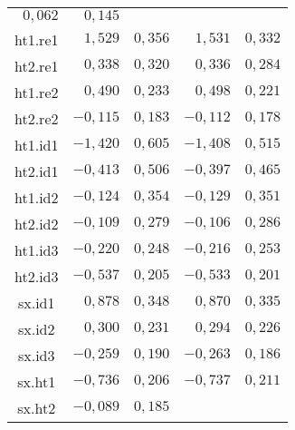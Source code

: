 \documentclass[]{book}
\begin{document}
\begin{center}
\begin{table}[tbp]
\begin{tabular}{|c|cc|cc|}
\multicolumn{1}{|r}{$0,062$} & \multicolumn{1}{r|}{$0,145$} \\ 
ht1.re1 & \multicolumn{1}{|r}{$1,529$} & \multicolumn{1}{r|}{$0,356$} & 
\multicolumn{1}{|r}{$1,531$} & \multicolumn{1}{r|}{$0,332$} \\ 
ht2.re1 & \multicolumn{1}{|r}{$0,338$} & \multicolumn{1}{r|}{$0,320$} & 
\multicolumn{1}{|r}{$0,336$} & \multicolumn{1}{r|}{$0,284$} \\ 
ht1.re2 & \multicolumn{1}{|r}{$0,490$} & \multicolumn{1}{r|}{$0,233$} & 
\multicolumn{1}{|r}{$0,498$} & \multicolumn{1}{r|}{$0,221$} \\ 
ht2.re2 & \multicolumn{1}{|r}{$-0,115$} & \multicolumn{1}{r|}{$0,183$} & 
\multicolumn{1}{|r}{$-0,112$} & \multicolumn{1}{r|}{$0,178$} \\ 
ht1.id1 & \multicolumn{1}{|r}{$-1,420$} & \multicolumn{1}{r|}{$0,605$} & 
\multicolumn{1}{|r}{$-1,408$} & \multicolumn{1}{r|}{$0,515$} \\ 
ht2.id1 & \multicolumn{1}{|r}{$-0,413$} & \multicolumn{1}{r|}{$0,506$} & 
\multicolumn{1}{|r}{$-0,397$} & \multicolumn{1}{r|}{$0,465$} \\ 
ht1.id2 & \multicolumn{1}{|r}{$-0,124$} & \multicolumn{1}{r|}{$0,354$} & 
\multicolumn{1}{|r}{$-0,129$} & \multicolumn{1}{r|}{$0,351$} \\ 
ht2.id2 & \multicolumn{1}{|r}{$-0,109$} & \multicolumn{1}{r|}{$0,279$} & 
\multicolumn{1}{|r}{$-0,106$} & \multicolumn{1}{r|}{$0,286$} \\ 
ht1.id3 & \multicolumn{1}{|r}{$-0,220$} & \multicolumn{1}{r|}{$0,248$} & 
\multicolumn{1}{|r}{$-0,216$} & \multicolumn{1}{r|}{$0,253$} \\ 
ht2.id3 & \multicolumn{1}{|r}{$-0,537$} & \multicolumn{1}{r|}{$0,205$} & 
\multicolumn{1}{|r}{$-0,533$} & \multicolumn{1}{r|}{$0,201$} \\ 
sx.id1 & \multicolumn{1}{|r}{$0,878$} & \multicolumn{1}{r|}{$0,348$} & 
\multicolumn{1}{|r}{$0,870$} & \multicolumn{1}{r|}{$0,335$} \\ 
sx.id2 & \multicolumn{1}{|r}{$0,300$} & \multicolumn{1}{r|}{$0,231$} & 
\multicolumn{1}{|r}{$0,294$} & \multicolumn{1}{r|}{$0,226$} \\ 
sx.id3 & \multicolumn{1}{|r}{$-0,259$} & \multicolumn{1}{r|}{$0,190$} & 
\multicolumn{1}{|r}{$-0,263$} & \multicolumn{1}{r|}{$0,186$} \\ 
sx.ht1 & \multicolumn{1}{|r}{$-0,736$} & \multicolumn{1}{r|}{$0,206$} & 
\multicolumn{1}{|r}{$-0,737$} & \multicolumn{1}{r|}{$0,211$} \\ 
sx.ht2 & \multicolumn{1}{|r}{$-0,089$} & \multicolumn{1}{r|}{$0,185$} & 

\end{tabular}
\end{table}
\end{center}
\end{document}
